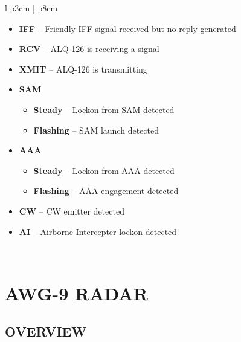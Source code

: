 \documentclass[fontHelvetica]{TechCheck}
\begin{document}
\begin{center}
\begin{longtable}{l p{3cm} | p{8cm}}
\begin{minipage}[t]{\linewidth}
\begin{itemize}
					\item \textbf{IFF} -- Friendly IFF signal received but no reply generated
					\item \textbf{RCV} -- ALQ-126 is receiving a signal
					\item \textbf{XMIT} -- ALQ-126 is transmitting
					\item \textbf{SAM}
					\begin{itemize}
						\item \textbf{Steady} -- Lockon from SAM detected
						\item \textbf{Flashing} -- SAM launch detected
					\end{itemize}
					\item \textbf{AAA}
					\begin{itemize}
						\item \textbf{Steady} -- Lockon from AAA detected
						\item \textbf{Flashing} -- AAA engagement detected
					\end{itemize}
					\item \textbf{CW} -- CW emitter detected
					\item \textbf{AI} -- Airborne Intercepter lockon detected
				\end{itemize}
			\end{minipage} \\
			\bottomrule
		\end{longtable}
	\end{center}

	\cleardoublepage

	\chapter{AWG-9 RADAR}
	\minitoc
	\cleardoublepage

	\section{OVERVIEW}
\end{document}

